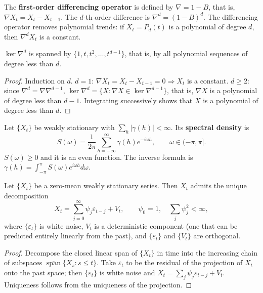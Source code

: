 \begin{definition}\label{def:ts_diff_operator}
The \textbf{first-order differencing operator} is defined by $\nabla = 1-B$, that is, $\nabla X_t=X_t-X_{t-1}$. The $d$-th order difference is $\nabla^d=(1-B)^d$. The differencing operator removes polynomial trends: if $X_t=P_d(t)$ is a polynomial of degree $d$, then $\nabla^d X_t$ is a constant.
\end{definition}

\begin{lemma}\label{lem:ts_diff_kernel}
$\ker\nabla^d$ is spanned by $\{1,t,t^2,\dots,t^{d-1}\}$, that is, by all polynomial sequences of degree less than $d$.
\end{lemma}

\begin{proof}
Induction on $d$. $d=1$: $\nabla X_t=X_t-X_{t-1}=0\Rightarrow X_t$ is a constant. $d\ge2$: since $\nabla^d=\nabla\nabla^{d-1}$, $\ker\nabla^d=\{X:\nabla X\in\ker\nabla^{d-1}\}$, that is, $\nabla X$ is a polynomial of degree less than $d-1$. Integrating successively shows that $X$ is a polynomial of degree less than $d$.
\end{proof}

\begin{definition}\label{def:ts_spectral_density}
Let $\{X_t\}$ be weakly stationary with $\sum_h|\gamma(h)|<\infty$. Its \textbf{spectral density} is
\[
S(\omega)=\frac{1}{2\pi}\sum_{h=-\infty}^{\infty}\gamma(h)e^{-i\omega h},\qquad \omega\in(-\pi,\pi].
\]
$S(\omega)\ge0$ and it is an even function. The inverse formula is $\gamma(h)=\int_{-\pi}^{\pi}S(\omega)e^{i\omega h}d\omega$.
\end{definition}

\begin{theorem}\label{thm:ts_wold}
Let $\{X_t\}$ be a zero-mean weakly stationary series. Then $X_t$ admits the unique decomposition
\[
X_t=\sum_{j=0}^{\infty}\psi_j\varepsilon_{t-j}+V_t,\qquad \psi_0=1,\quad\sum_j\psi_j^2<\infty,
\]
where $\{\varepsilon_t\}$ is white noise, $V_t$ is a deterministic component (one that can be predicted entirely linearly from the past), and $\{\varepsilon_t\}$ and $\{V_t\}$ are orthogonal.
\end{theorem}

\begin{proof}
Decompose the closed linear span of $\{X_t\}$ in time into the increasing chain of subspaces $\overline{\operatorname{span}}\{X_s:s\le t\}$. Take $\varepsilon_t$ to be the residual of the projection of $X_t$ onto the past space; then $\{\varepsilon_t\}$ is white noise and $X_t=\sum_j\psi_j\varepsilon_{t-j}+V_t$. Uniqueness follows from the uniqueness of the projection.
\end{proof}

